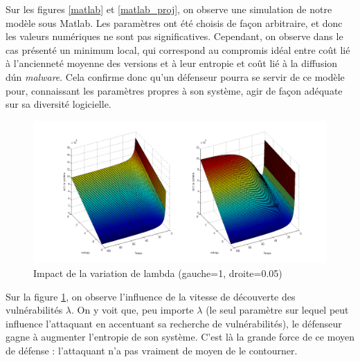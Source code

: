 Sur les figures \ref{matlab} et \ref{matlab_proj}, on observe une simulation de notre modèle sous Matlab. Les paramètres ont été choisis de façon arbitraire, et donc les valeurs numériques ne sont pas significatives. Cependant, on observe dans le cas présenté un minimum local, qui correspond au compromis idéal entre coût lié à  l'ancienneté moyenne des versions et à leur entropie et coût lié à la diffusion dún \textit{malware}. Cela confirme donc qu'un défenseur pourra se servir de ce modèle pour, connaissant les paramètres propres à son système, agir de façon adéquate sur sa diversité logicielle.

\begin{figure}[!ht]
\centering
     \includegraphics[width=1.0\linewidth]{Paul/Matlab/lambda_var.png}
     \caption{Impact de la variation de lambda (gauche=1, droite=0.05)}
     \label{lambda}
\end{figure}

Sur la figure \ref{lambda}, on observe l'influence de la vitesse de découverte des vulnérabilités $\lambda$. On y voit que, peu importe $\lambda$ (le seul paramètre sur lequel peut influence l'attaquant en accentuant sa recherche de vulnérabilités), le défenseur gagne à augmenter l'entropie de son système. C'est là la grande force de ce moyen de défense : l'attaquant n'a pas vraiment de moyen de le contourner.
